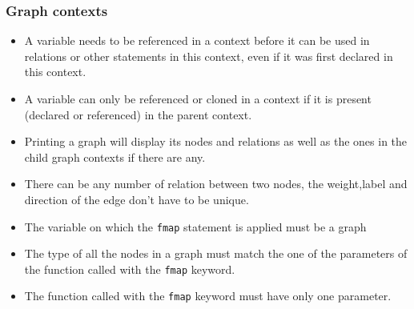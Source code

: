 \subsubsection{Graph contexts}

\begin{itemize}
    \item A variable needs to be referenced in a context before it can be used in relations or other statements in this context, even if it was first declared in this context.
\item A variable can only be referenced or cloned in a context if it is present (declared or referenced) in the parent context.
    \item Printing a graph will display its nodes and relations as well as the ones in the child graph contexts if there are any.
    \item There can be any number of relation between two nodes, the weight,label and direction of the edge don't have to be unique.
    \item The variable on which the \texttt{fmap} statement is applied must be a graph
    \item The type of all the nodes in a graph must match the one of the parameters of the function called with the \texttt{fmap} keyword.
    \item The function called with the \texttt{fmap} keyword must have only one parameter.
    \end{itemize}


